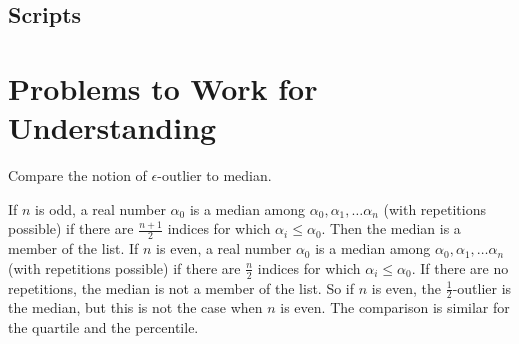 \documentclass[12pt]{article}
\begin{document}
\subsection*{Scripts}



\hr

\section*{Problems to Work for Understanding}
\renewcommand{\theexerciseseries}{}
\renewcommand{\theexercise}{\arabic{exercise}}

\begin{exercise}
  Compare the notion of \( \epsilon \)-outlier to median.
\end{exercise}
\begin{solution}
  If \( n \) is odd, a real number \( \alpha_0 \) is a median among
  \( \alpha_0, \alpha_1, \dots \alpha_n \) (with repetitions possible)
  if there are \( \frac{n+1}{2} \) indices for which
  \( \alpha_i \le \alpha_0 \).  Then the median is a member of the
  list.  If \( n \) is even, a real number \( \alpha_0 \) is a median
  among \( \alpha_0, \alpha_1, \dots \alpha_n \) (with repetitions
  possible) if there are \( \frac{n}{2} \) indices for which
  \( \alpha_i \le \alpha_0 \).  If there are no repetitions, the
  median is not a member of the list.  So if \( n \) is even, the
  \( \frac{1}{2} \)-outlier is the median, but this is not the case
  when \( n \) is even.  The comparison is similar for the quartile
  and the percentile.
\end{solution}
  
\end{document}
